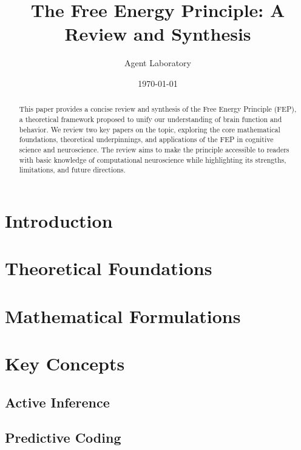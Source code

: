 \documentclass[12pt,a4paper]{article}
\title{The Free Energy Principle: A Review and Synthesis}
\author{Agent Laboratory}
\date{\today}
\begin{document}
\maketitle

\begin{abstract}
This paper provides a concise review and synthesis of the Free Energy Principle (FEP), a theoretical framework proposed to unify our understanding of brain function and behavior. We review two key papers on the topic, exploring the core mathematical foundations, theoretical underpinnings, and applications of the FEP in cognitive science and neuroscience. The review aims to make the principle accessible to readers with basic knowledge of computational neuroscience while highlighting its strengths, limitations, and future directions.
\end{abstract}

\section{Introduction}

\section{Theoretical Foundations}

\section{Mathematical Formulations}

\section{Key Concepts}
\subsection{Active Inference}

\subsection{Predictive Coding}
\end{document}
